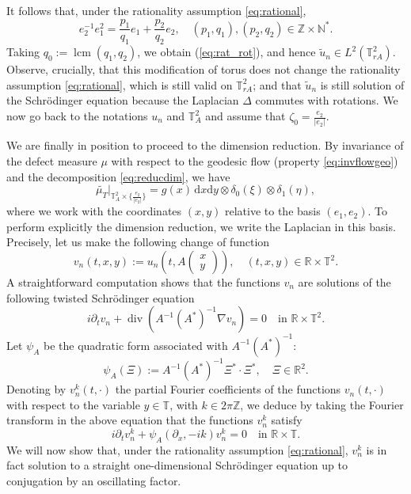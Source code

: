 \documentclass[a4paper,11pt]{amsart}
\numberwithin{equation}{section}
\theoremstyle{definition}
\DeclareMathOperator{\divv}{div}
\begin{document}
It follows that, under the rationality assumption \eqref{eq:rational},
$$
e_2 ^{-1} e_1^2 = \frac{p_1}{q_1} e_1 + \frac{p_2}{q_2} e_2, \quad (p_1, q_1), (p_2, q_2) \in \mathbb Z \times \mathbb N^*.
$$
Taking $q_0 := \operatorname{lcm}(q_1, q_2)$, we obtain (\ref{eq:rat_rot}), and hence $\widetilde u_n \in  L^2(\mathbb T^2_{rA})$.
Observe, crucially, that this modification of torus does not change the rationality assumption \eqref{eq:rational}, which is still valid on $\mathbb T^2_{rA}$; and that $\widetilde u_n$ is still solution of the Schr\"odinger equation because
 the Laplacian $\Delta$ commutes with rotations.
 We now go back to the notations $u_n$ and $\mathbb T^2_A$ and assume that $\zeta_0= \frac{e_2}{|e_2|}$.

We are finally in position to proceed to the dimension reduction. By invariance of the defect measure $\mu$ with respect to the geodesic flow (property \eqref{eq:invflowgeo}) and the decomposition \eqref{eq:reducdim}, we have
\[
    \widetilde{\mu_T}\big\vert_{{\mathbb T}^2_{A}\times\{\frac{e_2}{|e_2|}\}} = g(x)\,\mathrm dx\mathrm dy\otimes\delta_0(\xi)\otimes\delta_1(\eta),
\]
where we work with the coordinates $(x,y)$ relative to the basis $(e_1,e_2)$. 
To perform explicitly the dimension reduction, we write the Laplacian in this basis. Precisely, let us make the following change of function
\[
	v_n(t,x,y) := u_n\left(t,A\begin{pmatrix}
        x \\
        y
    \end{pmatrix}\right),\quad (t,x,y)\in\mathbb R\times\mathbb T^2.
\]
A straightforward computation shows that the functions $v_n$ are solutions of the following twisted Schr\"odinger equation
\[
	i\partial_tv_n + \divv(A^{-1}(A^*)^{-1}\nabla v_n) = 0\quad\text{in $\mathbb R\times\mathbb T^2$.}
\]
Let $\psi_A$ be the quadratic form associated with $A^{-1}(A^*)^{-1}$:
$$
\psi_A(\Xi) := A^{-1}(A^*)^{-1} \Xi^* \cdot \Xi^*, \quad \Xi \in \mathbb R^2.
$$
Denoting by $v^k_n(t,\cdot)$ the partial Fourier coefficients of the functions $v_n(t,\cdot)$ with respect to the variable $y\in\mathbb T$, with $k\in 2\pi\mathbb Z$, we deduce by taking the Fourier transform in the above equation that the functions $v^k_n$ satisfy
\begin{equation}\label{eq:eqnfour}
	i\partial_tv^k_n + \psi_A(\partial_x, -ik)v^k_n = 0\quad\text{in $\mathbb R\times\mathbb T$.}
\end{equation}
We will now show that, under the rationality assumption \eqref{eq:rational}, $v^k_n$ is in fact solution to a straight one-dimensional Schr\"odinger equation up to conjugation by an oscillating factor.
\end{document}
